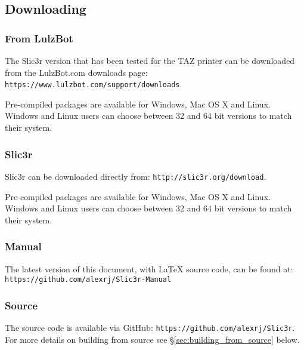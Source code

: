 

\subsection{Downloading}

\subsubsection{From LulzBot} %
\label{sub:from_LulzBot}
The Slic3r version that has been tested for the TAZ printer can be downloaded from the LulzBot.com downloads page: \texttt{https://www.lulzbot.com/support/downloads}.

Pre-compiled packages are available for Windows, Mac OS X and Linux.  Windows and Linux users can choose between 32 and 64 bit versions to match their system.

\subsubsection{Slic3r} %
\label{sub:slic3r}
Slic3r can be downloaded directly from: \texttt{http://slic3r.org/download}.

Pre-compiled packages are available for Windows, Mac OS X and Linux.  Windows and Linux users can choose between 32 and 64 bit versions to match their system.

\subsubsection{Manual} %
\label{sub:manual}

The latest version of this document, with {\LaTeX} source code, can be found at: \texttt{https://github.com/alexrj/Slic3r-Manual}


\subsubsection{Source} %
\label{sub:source}

The source code is available via GitHub: \texttt{https://github.com/alexrj/Slic3r}. For more details on building from source see §\ref{sec:building_from_source} below.

